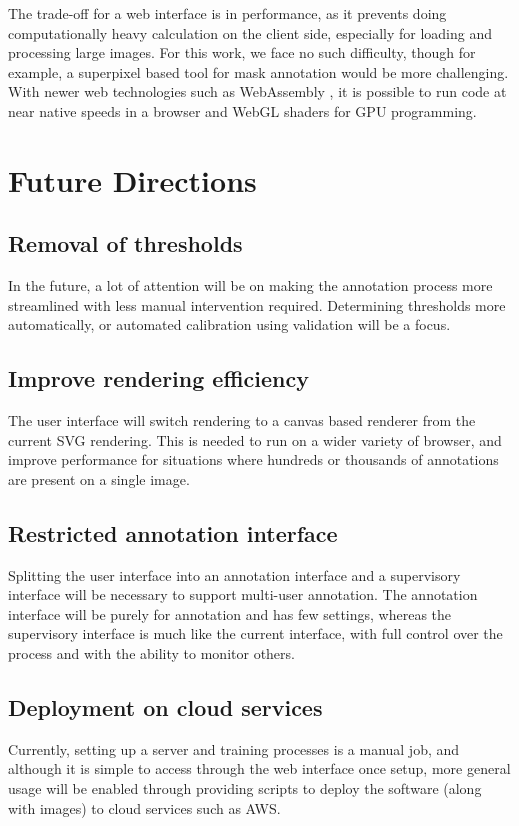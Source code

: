 The trade-off for a web interface is in performance, as it prevents doing computationally heavy calculation on the client side, especially for loading and processing large images. For this work, we face no such difficulty, though for example, a superpixel based tool for mask annotation would be more challenging. With newer web technologies such as WebAssembly \cite{Haas2017}, it is possible to run code at near native speeds in a browser and WebGL shaders for GPU programming.



\section{Future Directions}
\label{sec:design_future_direction}

\subsection {Removal of thresholds}
In the future, a lot of attention will be on making the annotation process more streamlined with less manual intervention required. Determining thresholds more automatically, or automated calibration using validation will be a focus.

\subsection {Improve rendering efficiency}
The user interface will switch rendering to a canvas based renderer from the current SVG rendering. This is needed to run on a wider variety of browser, and improve performance for situations where hundreds or thousands of annotations are present on a single image.

\subsection {Restricted annotation interface}
Splitting the user interface into an annotation interface and a supervisory interface will be necessary to support multi-user annotation. The annotation interface will be purely for annotation and has few settings, whereas the supervisory interface is much like the current interface, with full control over the process and with the ability to monitor others.

\subsection {Deployment on cloud services}
Currently, setting up a server and training processes is a manual job, and although it is simple to access through the web interface once setup, more general usage will be enabled through providing scripts to deploy the software (along with images) to cloud services such as \gls{AWS}. 

